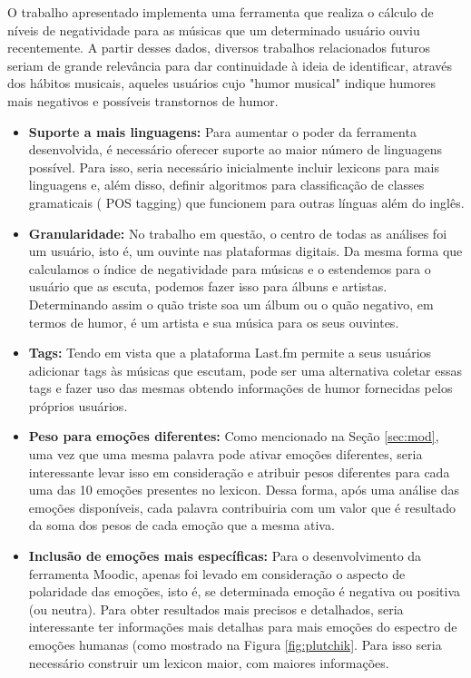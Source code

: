 O trabalho apresentado implementa uma ferramenta que realiza o cálculo
de níveis de negatividade para as músicas que um determinado usuário
ouviu recentemente. A partir desses dados, diversos trabalhos
relacionados futuros seriam de grande relevância para dar continuidade
à ideia de identificar, através dos hábitos musicais, aqueles usuários
cujo "humor musical" indique humores mais negativos e possíveis 
transtornos de humor.

\begin{itemize}
	\item \textbf{Suporte a mais linguagens:} Para aumentar o poder
	da ferramenta desenvolvida, é necessário oferecer suporte ao
	maior número de linguagens possível. Para isso, seria necessário
	inicialmente incluir lexicons para mais linguagens e, além disso,
	definir algoritmos para classificação de classes gramaticais (
	POS tagging) que funcionem para outras línguas além do
	inglês.

	\item \textbf{Granularidade:} No trabalho em questão, o centro de 
	todas as análises foi um usuário, isto é, um ouvinte nas plataformas
	digitais. Da mesma forma que calculamos o índice de negatividade para
	músicas e o estendemos para o usuário que as escuta, podemos fazer
	isso para álbuns e artistas. Determinando assim o quão triste
	soa um álbum ou o quão negativo, em termos de humor, é um artista
	e sua música para os seus ouvintes.

	\item \textbf{Tags:} Tendo em vista que a plataforma Last.fm
	permite a seus usuários adicionar tags às músicas que escutam,
	pode ser uma alternativa coletar essas tags e fazer uso das mesmas
	obtendo informações de humor fornecidas pelos próprios usuários.

	\item \textbf{Peso para emoções diferentes:} Como mencionado na
	Seção \ref{sec:mod}, uma vez que uma mesma palavra pode ativar
	emoções diferentes, seria interessante levar isso em consideração
	e atribuir pesos diferentes para cada uma das 10 emoções presentes
	no lexicon. Dessa forma, após uma análise das emoções disponíveis,
	cada palavra contribuiria com um valor que é resultado da soma
	dos pesos de cada emoção que a mesma ativa.

	\item \textbf{Inclusão de emoções mais específicas:} Para o
	desenvolvimento da ferramenta Moodic, apenas foi levado em 
	consideração o aspecto de polaridade das emoções, isto é,
	se determinada emoção é negativa ou positiva (ou neutra).
	Para obter resultados mais precisos e detalhados, seria
	interessante ter informações mais detalhas para mais
	emoções do espectro de emoções humanas (como mostrado
	na Figura \ref{fig:plutchik}. Para isso seria 
	necessário construir um lexicon maior, com maiores informações.


\end{itemize}
